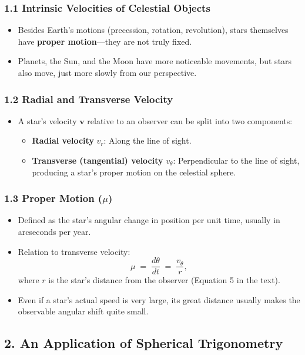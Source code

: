 \subsubsection{1.1 Intrinsic Velocities of Celestial Objects}
\begin{itemize}
  \item Besides Earth’s motions (precession, rotation, revolution), stars themselves have \textbf{proper motion}---they are not truly fixed.
  \item Planets, the Sun, and the Moon have more noticeable movements, but stars also move, just more slowly from our perspective.
\end{itemize}

\subsubsection{1.2 Radial and Transverse Velocity}
\begin{itemize}
  \item A star’s velocity $\mathbf{v}$ relative to an observer can be split into two components:
  \begin{itemize}
    \item \textbf{Radial velocity} $v_r$: Along the line of sight.
    \item \textbf{Transverse (tangential) velocity} $v_\theta$: Perpendicular to the line of sight, producing a star’s proper motion on the celestial sphere.
  \end{itemize}
\end{itemize}

\subsubsection{1.3 Proper Motion ($\mu$)}
\begin{itemize}
  \item Defined as the star’s angular change in position per unit time, usually in arcseconds per year.
  \item Relation to transverse velocity:
  \[
    \mu \;=\; \frac{d\theta}{dt} \;=\; \frac{v_\theta}{r},
  \]
  where $r$ is the star’s distance from the observer (Equation 5 in the text).
  \item Even if a star’s actual speed is very large, its great distance usually makes the observable angular shift quite small.
\end{itemize}

\subsection{2. An Application of Spherical Trigonometry}


